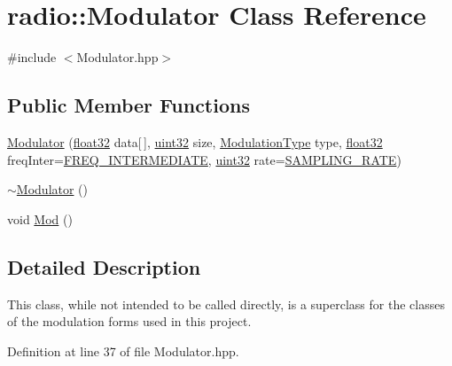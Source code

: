 \hypertarget{classradio_1_1Modulator}{\section{radio\+:\+:Modulator Class Reference}
\label{classradio_1_1Modulator}
}


{\ttfamily \#include $<$Modulator.\+hpp$>$}

\subsection*{Public Member Functions}
\begin{DoxyCompactItemize}
\item 
\hyperlink{classradio_1_1Modulator_ab202651b368986cc76673b6e997550b8}{Modulator} (\hyperlink{definitions_8hpp_aacdc525d6f7bddb3ae95d5c311bd06a1}{float32} data\mbox{[}$\,$\mbox{]}, \hyperlink{definitions_8hpp_a1134b580f8da4de94ca6b1de4d37975e}{uint32} size, \hyperlink{namespaceradio_a46fb7299001138f28b7f69975c58399e}{Modulation\+Type} type, \hyperlink{definitions_8hpp_aacdc525d6f7bddb3ae95d5c311bd06a1}{float32} freq\+Inter=\hyperlink{namespaceradio_aa82ddc6ba206798fd70ffc25665b3cb6}{F\+R\+E\+Q\+\_\+\+I\+N\+T\+E\+R\+M\+E\+D\+I\+A\+T\+E}, \hyperlink{definitions_8hpp_a1134b580f8da4de94ca6b1de4d37975e}{uint32} rate=\hyperlink{namespaceradio_a284213fea4beed2f74bb936927cbe654}{S\+A\+M\+P\+L\+I\+N\+G\+\_\+\+R\+A\+T\+E})
\item 
\hyperlink{classradio_1_1Modulator_a712e6e110c57b29ebdd754bd34bf269b}{$\sim$\+Modulator} ()
\item 
void \hyperlink{classradio_1_1Modulator_ab5eac6e4900579486b5871b48e64cdab}{Mod} ()
\end{DoxyCompactItemize}


\subsection{Detailed Description}
This class, while not intended to be called directly, is a superclass for the classes of the modulation forms used in this project. 

Definition at line 37 of file Modulator.\+hpp.



